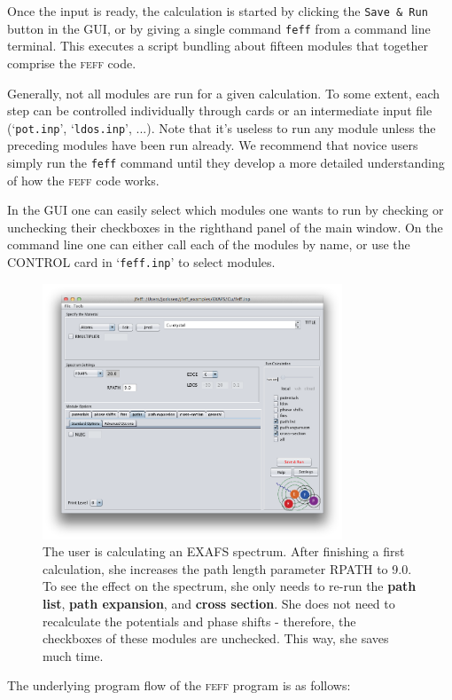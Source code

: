 \documentclass[11pt,oneside]{report} %
\renewcommand{\htmlref}[2]{\hyperlink{#2}{#1}}
\newcommand{\program}[1]{\textsc{#1}}
\newcommand{\feff}{\program{feff}}
\newcommand{\file}[1]{`\texttt{#1}'}
\newcommand{\module}[1]{\textrm{\bf{#1}}}
\renewcommand{\htmlref}[2]{{#1}} %
\begin{document}
Once the input is ready, the calculation is started by clicking the \texttt{Save \& Run} button in the GUI, or by giving a single command
\texttt{feff} from a command line terminal.  This executes a script bundling about fifteen modules that together comprise the {\feff} code.  

Generally, not all modules are run for a given calculation.  To some extent, each step can be
controlled individually through cards or an intermediate input file (\file{pot.inp}, \file{ldos.inp}, ...).  Note that it's useless to run any module unless the preceding modules have been run already.  We recommend that novice users simply run the \texttt{feff} command until they develop a more detailed understanding of how the {\feff} code works.  

In the GUI one can easily select which modules one wants to run by checking or unchecking their checkboxes in the righthand panel of the main window.  On the command line one can either call each of the modules by name, or use the \htmlref{CONTROL}{card:con} card in \file{feff.inp} to select modules.  


\begin{figure}[H]
	\centering
		\includegraphics[height=3.0in]{control1.png}
		\caption{The user is calculating an EXAFS spectrum.  After finishing a first calculation, she increases the path length parameter RPATH to 9.0.  To see the effect on the spectrum, she only needs to re-run the \module{path list}, \module{path expansion}, and \module{cross section}.  She does not need to recalculate the potentials and phase shifts - therefore, the checkboxes of these modules are unchecked.  This way, she saves much time.}   
	\label{fig:control1}
\end{figure}

The underlying program flow of the {\feff} program is as follows:
\end{document}
